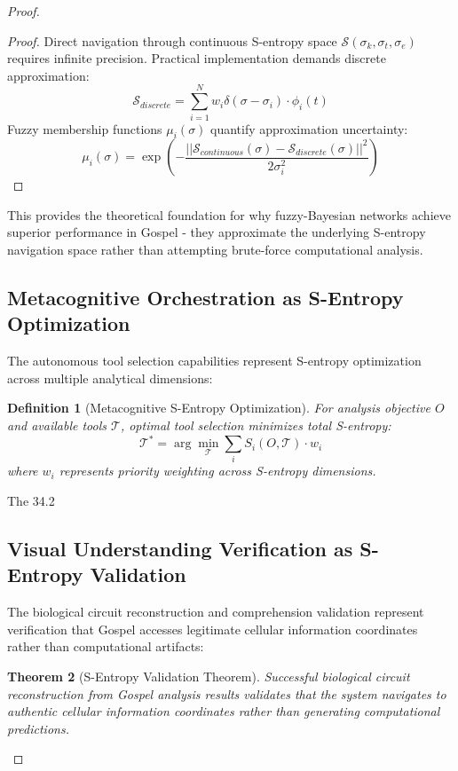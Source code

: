 \documentclass[12pt,a4paper]{article}
\newtheorem{theorem}{Theorem}[section]
\newtheorem{definition}[theorem]{Definition}
\begin{document}
\begin{proof}
\begin{proof}
Direct navigation through continuous S-entropy space $\mathcal{S}(\sigma_k, \sigma_t, \sigma_e)$ requires infinite precision. Practical implementation demands discrete approximation:
$$\mathcal{S}_{discrete} = \sum_{i=1}^{N} w_i \delta(\sigma - \sigma_i) \cdot \phi_i(t)$$
Fuzzy membership functions $\mu_i(\sigma)$ quantify approximation uncertainty:
$$\mu_i(\sigma) = \exp\left(-\frac{||\mathcal{S}_{continuous}(\sigma) - \mathcal{S}_{discrete}(\sigma)||^2}{2\sigma_i^2}\right)$$
\end{proof}

This provides the theoretical foundation for why fuzzy-Bayesian networks achieve superior performance in Gospel - they approximate the underlying S-entropy navigation space rather than attempting brute-force computational analysis.

\subsection{Metacognitive Orchestration as S-Entropy Optimization}

The autonomous tool selection capabilities represent S-entropy optimization across multiple analytical dimensions:

\begin{definition}[Metacognitive S-Entropy Optimization]
For analysis objective $O$ and available tools $\mathcal{T}$, optimal tool selection minimizes total S-entropy:
$$\mathcal{T}^* = \arg\min_{\mathcal{T}} \sum_{i} S_i(O, \mathcal{T}) \cdot w_i$$
where $w_i$ represents priority weighting across S-entropy dimensions.
\end{definition}

The 34.2%

\subsection{Visual Understanding Verification as S-Entropy Validation}

The biological circuit reconstruction and comprehension validation represent verification that Gospel accesses legitimate cellular information coordinates rather than computational artifacts:

\begin{theorem}[S-Entropy Validation Theorem]
Successful biological circuit reconstruction from Gospel analysis results validates that the system navigates to authentic cellular information coordinates rather than generating computational predictions.
\end{theorem}


\end{proof}
\end{document}
